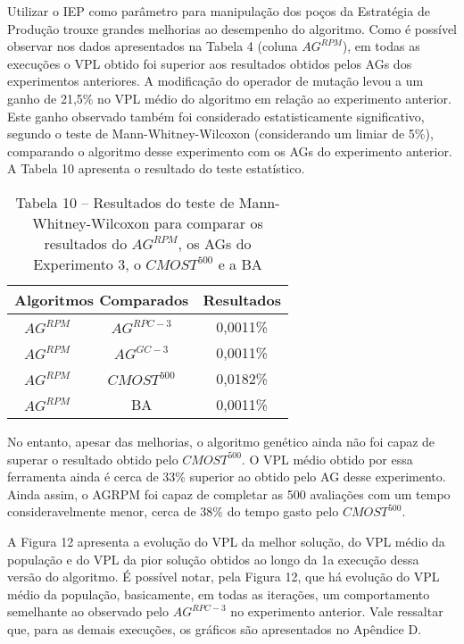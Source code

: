 Utilizar o IEP como parâmetro para manipulação dos poços da Estratégia de Produção trouxe grandes melhorias ao desempenho do algoritmo. Como é possível observar nos dados apresentados na Tabela 4 (coluna $AG^{RPM}$), em todas as execuções o VPL obtido foi superior aos resultados obtidos pelos AGs dos experimentos anteriores. A modificação do operador de mutação levou a um ganho de 21,5\% no VPL médio do algoritmo em relação ao experimento anterior. Este ganho observado também foi considerado estatisticamente significativo, segundo o teste de Mann-Whitney-Wilcoxon (considerando um limiar de 5\%), comparando o algoritmo desse experimento com os AGs do experimento anterior. A Tabela 10 apresenta o resultado do teste estatístico.

\begin{table}[H]
\centering
\caption{Tabela 10 – Resultados do teste de Mann-Whitney-Wilcoxon para comparar os resultados do $AG^{RPM}$, os AGs do Experimento 3, o $CMOST^500$ e a BA}

\begin{tabular}{|c|c|c|}
\hline
\multicolumn{2}{|c|}{Algoritmos Comparados} & Resultados \\ \hline
$AG^{RPM}$ & $AG^{RPC-3}$ & 0,0011\% \\ \hline
$AG^{RPM}$ & $AG^{GC-3}$ & 0,0011\% \\ \hline
$AG^{RPM}$ & $CMOST^500$ & 0,0182\% \\ \hline
$AG^{RPM}$ & BA & 0,0011\% \\ \hline


\end{tabular}
\end{table}

No entanto, apesar das melhorias, o algoritmo genético ainda não foi capaz de superar o resultado obtido pelo $CMOST^500$. O VPL médio obtido por essa ferramenta ainda é cerca de 33\% superior ao obtido pelo AG desse experimento. Ainda assim, o AGRPM foi capaz de completar as 500 avaliações com um tempo consideravelmente menor, cerca de 38\% do tempo gasto pelo $CMOST^500$.

A Figura 12 apresenta a evolução do VPL da melhor solução, do VPL médio da população e do VPL da pior solução obtidos ao longo da 1a execução dessa versão do algoritmo. É possível notar, pela Figura 12, que há evolução do VPL médio da população, basicamente, em todas as iterações, um comportamento semelhante ao observado pelo $AG^{RPC-3}$ no experimento anterior. Vale ressaltar que, para as demais execuções, os gráficos são apresentados no Apêndice D.

